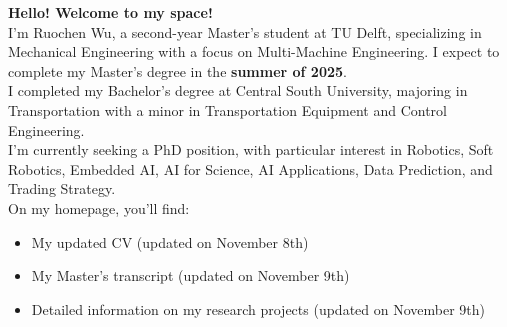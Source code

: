 \textbf{Hello! Welcome to my space!} \\

I’m Ruochen Wu, a second-year Master's student at TU Delft, specializing in Mechanical Engineering with a focus on Multi-Machine Engineering. I expect to complete my Master's degree in the \textbf{summer of 2025}. \\

I completed my Bachelor’s degree at Central South University, majoring in Transportation with a minor in Transportation Equipment and Control Engineering. \\

I’m currently seeking a PhD position, with particular interest in Robotics, Soft Robotics, Embedded AI, AI for Science, AI Applications, Data Prediction, and Trading Strategy. \\

On my homepage, you’ll find:
\begin{itemize}
    \item My updated CV (updated on November 8th)
    \item My Master’s transcript (updated on November 9th)
    \item Detailed information on my research projects (updated on November 9th)
\end{itemize}
